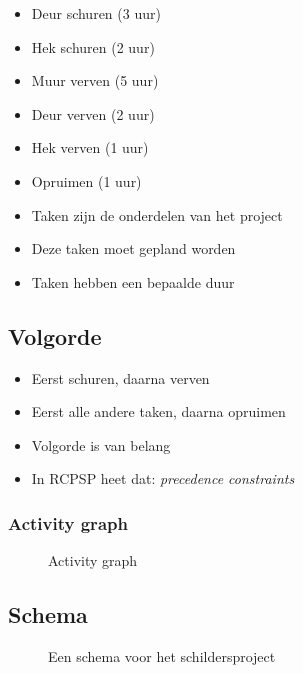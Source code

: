 \documentclass{beamer}
\theoremstyle{definition}
\newcommand{\inputtikz}[1]{}
\begin{document}
\begin{frame}
	\begin{itemize}
		\item Deur schuren (3 uur)
		\item Hek schuren (2 uur)
		\item<2-> Muur verven (5 uur)
		\item<2-> Deur verven (2 uur)
		\item<2-> Hek verven (1 uur)
		\item<3-> Opruimen (1 uur)
	\end{itemize}
\end{frame}

\begin{frame}
	\begin{itemize}
		\item Taken zijn de onderdelen van het project
		\item Deze taken moet gepland worden
		\item Taken hebben een bepaalde duur
	\end{itemize}
\end{frame}

\subsection{Volgorde}
\begin{frame}
	\begin{itemize}
		\item Eerst schuren, daarna verven
		\item Eerst alle andere taken, daarna opruimen
		\item Volgorde is van belang
		\item In RCPSP heet dat: \emph{precedence constraints}
	\end{itemize}
\end{frame}

\begin{frame}
	\frametitle{Activity graph}
	\vspace{-1em}
	\begin{figure}[ht]
		\makebox[\textwidth][c]{\resizebox{.8\paperwidth}{!}{
			\inputtikz{activity_graph_simple}
		}}
		\vspace{-1em}
		\caption{Activity graph}
		\label{fig:activity_graph}
	\end{figure}
\end{frame}

\subsection{Schema}
\begin{frame}
	\begin{itemize}
		\begin{figure}[ht]
			\centering
			
			\caption{Een schema voor het schildersproject}
			\label{fig:activity_graph}
		\end{figure}
	\end{itemize}
\end{frame}
\end{document}
